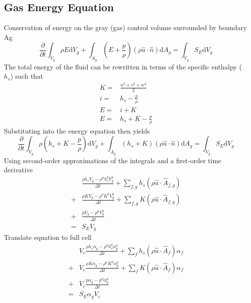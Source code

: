 \documentclass{article}
\renewcommand{\vec}[1]{\ensuremath{\hat{#1}}}
\renewcommand{\d}{\mathrm{d}}
\begin{document}
  \subsection{Gas Energy Equation}
    Conservation of energy on the gray (gas) control volume surrounded by boundary Ag
    \begin{equation*}
        \frac{\partial}{\partial t}\int_{V_g} \rho E \d V_g
      + \int_{A_g} (E + \frac{p}{\rho}) (\rho \vec{u} \cdot \vec{n}) \d A_g
      = \int_{V_g} S_{E} \d V_g
    \end{equation*}
    The total energy of the fluid can be rewritten in terms of the specific enthalpy ($h_s$) such that
    \begin{align*}
      K =& \frac{u^2 + v^2 + w^2}{2} \\
      i =& h_s - \frac{p}{\rho} \\
      E =& i + K \\
      E =& h_s + K - \frac{p}{\rho}
    \end{align*}
    Substituting into the energy equation then yields
    \begin{equation*}
          \frac{\partial}{\partial t}\int_{V_g} \rho (h_s + K - \frac{p}{\rho}) \d V_g
        + \int_{A_g} (h_s + K) (\rho \vec{u} \cdot \vec{n}) \d A_g
        = \int_{V_g} S_{E} \d V_g
    \end{equation*}
    Using second-order approximations of the integrals and a first-order time derivative
    \begin{align*}
        &\frac{\rho h_s V_g - \rho^0 h_s^0 V_g^0}{\Delta t}
      + \sum_{f,g} h_s (\rho \vec{u}\cdot\vec{A}_{f,g}) \\
      + &\frac{\rho K V_g - \rho^0 K^0 V_g^0}{\Delta t}
      + \sum_{f,g} K (\rho \vec{u}\cdot\vec{A}_{f,g}) \\
      + &\frac{p V_g - p^0 V_g^0}{\Delta t}\\
      = & S_E V_g
    \end{align*}
    Translate equation to full cell
    \begin{align*}
        &V_c \frac{\rho h_s \alpha_g - \rho^0 h_s^0 \alpha_g^0}{\Delta t}
      + \sum_{f} h_s (\rho \vec{u}\cdot\vec{A}_{f}) \alpha_f \\
      + &V_c \frac{\rho K \alpha_g - \rho^0 K^0 \alpha_g^0}{\Delta t}
      + \sum_{f} K (\rho \vec{u}\cdot\vec{A}_{f}) \alpha_f \\
      + &V_c \frac{p \alpha_g - p^0 \alpha_g^0}{\Delta t}\\
      = & S_E \alpha_g V_c
    \end{align*}
\end{document}
